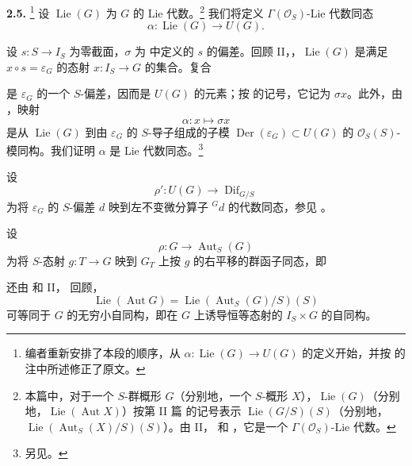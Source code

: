 \medskip
\noindent\textbf{2.5.}
\label{sga3:VIIA:2.5}
\footnote{编者重新安排了本段的顺序，从 \(\alpha:\operatorname{Lie}(G)\to U(G)\) 的定义开始，并按  的注中所述修正了原文。}
设 \(\operatorname{Lie}(G)\) 为 \(G\) 的 Lie 代数。\footnote{本篇中，对于一个 \(S\)-群概形 \(G\)（分别地，一个 \(S\)-概形 \(X\)），\(\operatorname{Lie}(G)\)（分别地，\(\operatorname{Lie}(\operatorname{Aut}X)\)）按第 II 篇 的记号表示 \(\operatorname{Lie}(G/S)(S)\)（分别地，\(\operatorname{Lie}(\operatorname{Aut}_S(X)/S)(S)\)）。由 II， 和 ，它是一个 \(\Gamma(\mathcal O_S)\)-Lie 代数。}
我们将定义 \(\Gamma(\mathcal O_S)\)-Lie 代数同态
\[
  \alpha:\operatorname{Lie}(G)\longrightarrow U(G).
\]

设 \(s:S\to I_S\) 为零截面，\(\sigma\) 为  中定义的 \(s\) 的偏差。回顾 II，，\(\operatorname{Lie}(G)\) 是满足 \(x\circ s=\varepsilon_G\) 的态射 \(x:I_S\to G\) 的集合。复合
\begin{center}
  \label{sga3:VIIA:2.5-sigma-x}
  
\end{center}
是 \(\varepsilon_G\) 的一个 \(S\)-偏差，因而是 \(U(G)\) 的元素；按  的记号，它记为 \(\sigma x\)。此外，由 ，映射
\[
  \alpha:x\longmapsto\sigma x
\]
是从 \(\operatorname{Lie}(G)\) 到由 \(\varepsilon_G\) 的 \(S\)-导子组成的子模 \(\operatorname{Der}(\varepsilon_G)\subset U(G)\) 的 \(\mathcal O_S(S)\)-模同构。我们证明 \(\alpha\) 是 Lie 代数同态。\footnote{另见。}

设
\[
  \rho':U(G)\longrightarrow\operatorname{Dif}_{G/S}
\]
为将 \(\varepsilon_G\) 的 \(S\)-偏差 \(d\) 映到左不变微分算子 \({}^Gd\) 的代数同态，参见 。

设
\[
  \rho:G\longrightarrow\operatorname{Aut}_S(G)
\]
为将 \(S\)-态射 \(g:T\to G\) 映到 \(G_T\) 上按 \(g\) 的右平移的群函子同态，即
\begin{center}
  \label{sga3:VIIA:2.5-rho-right-translation}
  
\end{center}
还由  和 II， 回顾，
\[
 \operatorname{Lie}(\operatorname{Aut}G)
 =
 \operatorname{Lie}(\operatorname{Aut}_S(G)/S)(S)
\]
可等同于 \(G\) 的无穷小自同构，即在 \(G\) 上诱导恒等态射的 \(I_S\times G\) 的自同构。

